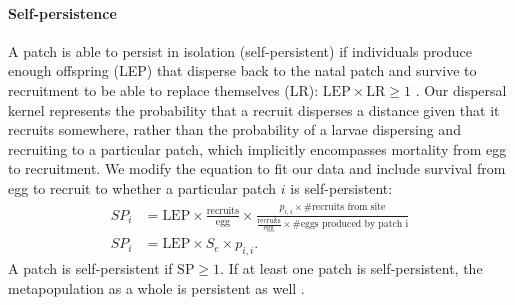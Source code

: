\documentclass[12pt, oneside]{article}   	%
\begin{document}
\paragraph*{Self-persistence}

A patch is able to persist in isolation (self-persistent) if individuals produce enough offspring (LEP) that disperse back to the natal patch and survive to recruitment to be able to replace themselves (LR): $\text{LEP} \times \text{LR} \geq 1$ \citep{burgess2014beyond}. Our dispersal kernel represents the probability that a recruit disperses a distance given that it recruits somewhere, rather than the probability of a larvae dispersing and recruiting to a particular patch, which implicitly encompasses mortality from egg to recruitment. We modify the equation to fit our data and include survival from egg to recruit to whether a particular patch $i$ is self-persistent: 
\begin{equation}
\begin{split}
SP_i &= \text{LEP} \times \frac{\text{recruits}}{\text{egg}} \times \frac{p_{i,i} \times \text{\# recruits from site}}{\frac{\text{recruits}}{\text{egg}} \times \text{\# eggs produced by patch i}} \\ 
SP_i &= \text{LEP} \times S_e \times p_{i,i}. \label{EQN_SP}
\end{split}
\end{equation}
A patch is self-persistent if $\text{SP} \geq 1$. If at least one patch is self-persistent, the metapopulation as a whole is persistent as well \citep{hastings_persistence_2006, burgess2014beyond}.




\end{document}
